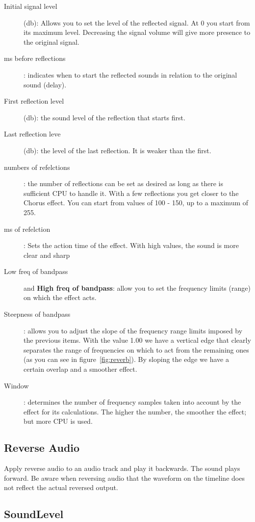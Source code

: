 \begin{description}
	\item[Initial signal level](db): Allows you to set the level of the reflected signal. At 0 you start from its maximum level. Decreasing the signal volume will give more presence to the original signal.
	\item[ms before reflections]: indicates when to start the reflected sounds in relation to the original sound  (delay).
	\item[First reflection level] (db): the sound level of the reflection that starts first.
	\item[Last reflection leve] (db): the level of the last reflection. It is weaker than the first.
	\item[numbers of refelctions]: the number of reflections can be set as desired as long as there is sufficient CPU to handle it. With a few reflections you get closer to the Chorus effect. You can start from values of 100 - 150, up to a maximum of 255.
	\item[ms of refelction]: Sets the action time of the effect. With high values, the sound is more clear and sharp
	\item[Low freq of bandpass] and \textbf{High freq of bandpass}: allow you to set the frequency limits (range) on which the effect acts.
	\item[Steepness of bandpass]: allows you to adjust the slope of the frequency range limits imposed by the previous items. With the value 1.00 we have a vertical edge that clearly separates the range of frequencies on which to act from the remaining ones (as you can see in figure~\ref{fig:reverb}). By sloping the edge we have a certain overlap and a smoother effect.
	\item[Window]: determines the number of frequency samples taken into account by the effect for its calculations. The higher the number, the smoother the effect; but more CPU is used.
\end{description}

\subsection{Reverse Audio}%
\label{sub:reverse_audio}

Apply reverse audio to an audio track and play it backwards. The sound plays forward. Be aware when reversing audio that the waveform on the timeline does not reflect the actual reversed output.

\subsection{SoundLevel}%
\label{sub:soundlevel}

